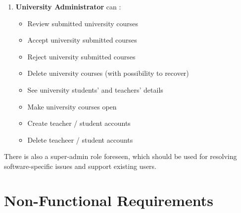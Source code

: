 \documentclass[a4paper,11pt,twoside]{report}
\theoremstyle{definition}
\begin{document}
\begin{enumerate}
    \item \textbf{University Administrator} can :
    \begin{itemize} \itemsep0em 
      \vspace{-0.2cm}\item Review submitted university courses
      \vspace{-0.2cm}\item Accept university submitted courses
      \vspace{-0.2cm}\item Reject university submitted courses
      \vspace{-0.2cm}\item Delete university courses (with possibility to recover)
      \vspace{-0.2cm}\item See university students' and teachers' details
      \vspace{-0.2cm}\item Make university courses open
      \vspace{-0.2cm}\item Create teacher / student accounts 
      \vspace{-0.2cm}\item Delete teacheer / student accounts
    \end{itemize}
\end{enumerate}

There is also a super-admin role foreseen, which should be used for resolving software-specific issues and support existing users.

\chapter*{Non-Functional Requirements}
\end{document}
